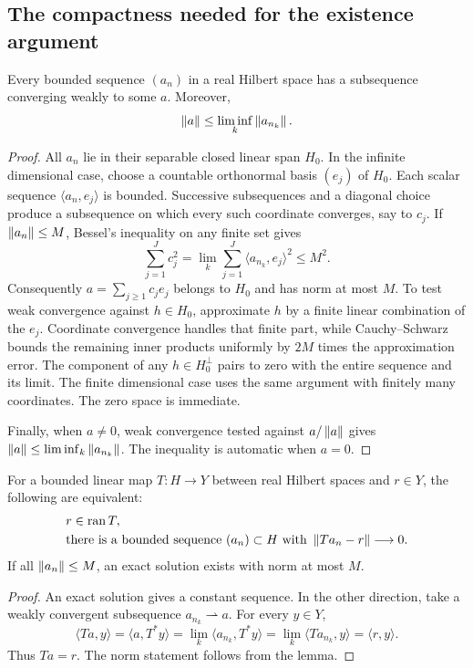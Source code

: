 \subsection{The compactness needed for the existence argument}
\begin{lemma}\label{lem:weak-subsequence}
Every bounded sequence $(a_n)$ in a real Hilbert space has a subsequence converging weakly to some $a$. Moreover,
\[
 \left\lVert a\right\rVert\le\liminf_k\left\lVert a_{n_k}\right\rVert.
\]
\end{lemma}
\begin{proof}
All $a_n$ lie in their separable closed linear span $H_0$. In the infinite dimensional case, choose a countable orthonormal basis $(e_j)$ of $H_0$. Each scalar sequence $\langle a_n,e_j\rangle$ is bounded. Successive subsequences and a diagonal choice produce a subsequence on which every such coordinate converges, say to $c_j$. If $\left\lVert a_n\right\rVert\le M$, Bessel's inequality on any finite set gives
\[
 \sum_{j=1}^{J}c_j^2
 =\lim_k\sum_{j=1}^{J}\langle a_{n_k},e_j\rangle^2\le M^2.
\]
Consequently $a=\sum_{j\ge1}c_je_j$ belongs to $H_0$ and has norm at most $M$. To test weak convergence against $h\in H_0$, approximate $h$ by a finite linear combination of the $e_j$. Coordinate convergence handles that finite part, while Cauchy--Schwarz bounds the remaining inner products uniformly by $2M$ times the approximation error. The component of any $h\in H_0^\perp$ pairs to zero with the entire sequence and its limit. The finite dimensional case uses the same argument with finitely many coordinates. The zero space is immediate.

Finally, when $a\ne0$, weak convergence tested against $a/\left\lVert a\right\rVert$ gives $\left\lVert a\right\rVert\le\liminf_k\left\lVert a_{n_k}\right\rVert$. The inequality is automatic when $a=0$.
\end{proof}

\begin{theorem}\label{WR01}
For a bounded linear map $T:H\to Y$ between real Hilbert spaces and $r\in Y$, the following are equivalent:
\[
 \begin{split}
 &r\in\operatorname{ran} T,\\
 &\text{there is a bounded sequence }(a_n)\subset H
       \text{ with }\left\lVert Ta_n-r\right\rVert\longrightarrow0.
 \end{split}
\]
If all $\left\lVert a_n\right\rVert\le M$, an exact solution exists with norm at most $M$.
\end{theorem}
\begin{proof}
An exact solution gives a constant sequence. In the other direction, take a weakly convergent subsequence $a_{n_k}\rightharpoonup a$. For every $y\in Y$,
\[
 \langle Ta,y\rangle
 =\langle a,T^*y\rangle
 =\lim_k\langle a_{n_k},T^*y\rangle
 =\lim_k\langle Ta_{n_k},y\rangle
 =\langle r,y\rangle.
\]
Thus $Ta=r$. The norm statement follows from the lemma.
\end{proof}


